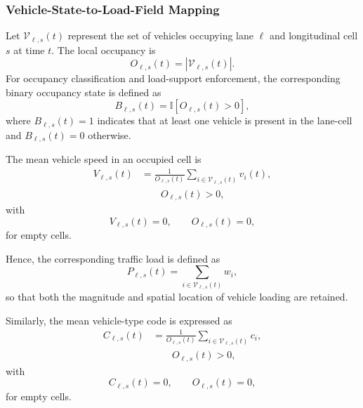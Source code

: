 \documentclass[journal]{IEEEtran}
\begin{document}
\subsubsection{Vehicle-State-to-Load-Field Mapping}
\label{subsec:load_field_mapping}

Let $\mathcal{V}_{\ell,s}(t)$ represent the set of vehicles occupying lane $\ell$ and longitudinal cell $s$ at time $t$. The local occupancy is
\begin{equation}
O_{\ell,s}(t)=\left|\mathcal{V}_{\ell,s}(t)\right|.
\label{eq:cell_occupancy}
\end{equation}
For occupancy classification and load-support enforcement, the corresponding binary occupancy state is defined as
\begin{equation}
B_{\ell,s}(t)=\mathbb{I}\left[O_{\ell,s}(t)>0\right],
\label{eq:binary_occupancy}
\end{equation}
where $B_{\ell,s}(t)=1$ indicates that at least one vehicle is present in the lane-cell and $B_{\ell,s}(t)=0$ otherwise.

The mean vehicle speed in an occupied cell is
\begin{equation}
\begin{aligned}
V_{\ell,s}(t)&=\frac{1}{O_{\ell,s}(t)}\sum_{i\in\mathcal{V}_{\ell,s}(t)}v_i(t),\\
&\qquad O_{\ell,s}(t)>0,
\end{aligned}
\label{eq:mean_vehicle_speed}
\end{equation}
with
\begin{equation}
V_{\ell,s}(t)=0,\qquad O_{\ell,s}(t)=0,
\label{eq:empty_vehicle_speed}
\end{equation}
for empty cells.

Hence, the corresponding traffic load is defined as
\begin{equation}
P_{\ell,s}(t)=\sum_{i\in\mathcal{V}_{\ell,s}(t)}w_i,
\label{eq:cell_load}
\end{equation}
so that both the magnitude and spatial location of vehicle loading are retained.

Similarly, the mean vehicle-type code is expressed as
\begin{equation}
\begin{aligned}
C_{\ell,s}(t)&=\frac{1}{O_{\ell,s}(t)}\sum_{i\in\mathcal{V}_{\ell,s}(t)}c_i,\\
&\qquad O_{\ell,s}(t)>0,
\end{aligned}
\label{eq:mean_vehicle_type}
\end{equation}
with
\begin{equation}
C_{\ell,s}(t)=0,\qquad O_{\ell,s}(t)=0,
\label{eq:empty_vehicle_type}
\end{equation}
for empty cells.
\end{document}
